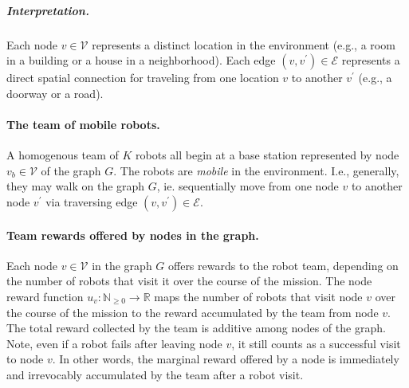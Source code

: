 \documentclass[11pt, oneside]{article}
\begin{document}
\vspace{-\baselineskip}
\subparagraph{Interpretation.} 
Each node $v\in \mathcal{V}$ represents a distinct location in the environment (e.g., a room in a building or a house in a neighborhood).
Each edge $(v, v^\prime) \in \mathcal{E}$ represents a direct spatial connection for traveling from one location $v$ to another $v^\prime$ (e.g., a doorway or a road).



\paragraph{The team of mobile robots.}
A homogenous team of $K$ robots all begin at a base station represented by node $v_b \in \mathcal{V}$ of the graph $G$. The robots are \emph{mobile} in the environment. I.e., generally, they may walk on the graph $G$, ie. sequentially move from one node $v$ to another node $v^\prime$ via traversing edge $(v, v^\prime)\in\mathcal{E}$.

\paragraph{Team rewards offered by nodes in the graph.}
Each node $v\in \mathcal{V}$ in the graph $G$ offers rewards to the robot team, depending on the number of robots that visit it over the course of the mission. 
The node reward function $u_v: \mathbb{N}_{\geq 0} \rightarrow \mathbb{R}$ maps 
the number of robots that visit node $v$ over the course of the mission
 to 
 the reward accumulated by the team from node $v$.
 The total reward collected by the team is additive among nodes of the graph.
Note, even if a robot fails after leaving node $v$, it still counts as a successful visit to node $v$.
In other words, the marginal reward offered by a node is immediately and irrevocably accumulated by the team after a robot visit.
\end{document}
